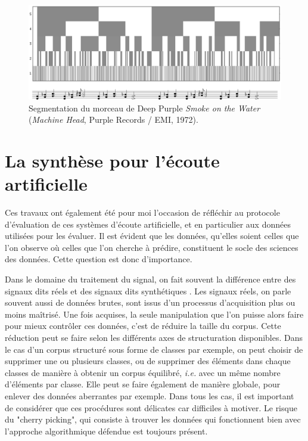 \begin{figure}[t]
  \includegraphics[width=\textwidth]{figures/smokeCrop}
  \caption{Segmentation du morceau de Deep Purple \emph{Smoke on the Water} (\emph{Machine Head}, Purple Records / EMI, 1972).}  \label{fig:smoke}
\end{figure}

\section{ \nmu La  synthèse pour l'écoute artificielle} \label{sec:dcase}

Ces travaux ont également été pour moi l'occasion de réfléchir au protocole d'évaluation de ces systèmes d'écoute artificielle, et en particulier aux données utilisées pour les évaluer. Il est évident que les données, qu'elles soient celles que l'on observe où celles que l'on cherche à prédire, constituent le socle des sciences des données. Cette question est donc d'importance.

Dans le domaine du traitement du signal, on fait souvent la différence entre des signaux dits \og réels \fg et des signaux dits \og synthétiques \fg. Les signaux réels, on parle souvent aussi de données brutes, sont issus d'un processus d'acquisition plus ou moins maîtrisé. Une fois acquises, la seule manipulation que l'on puisse alors faire pour mieux contrôler ces données, c'est de réduire la taille du corpus. Cette réduction peut se faire selon les différents axes de structuration disponibles. Dans le cas d'un corpus structuré sous forme de classes par exemple, on peut choisir de supprimer une ou plusieurs classes, ou de supprimer des éléments dans chaque classes de manière à obtenir un corpus équilibré, \textit{i.e.} avec un même nombre d'éléments par classe. Elle peut se faire également de manière globale, pour enlever des données aberrantes par exemple. Dans tous les cas, il est important de considérer que ces procédures sont délicates car difficiles à motiver. Le risque du "cherry picking", qui consiste à trouver les données qui fonctionnent bien avec l'approche algorithmique défendue est toujours présent.

